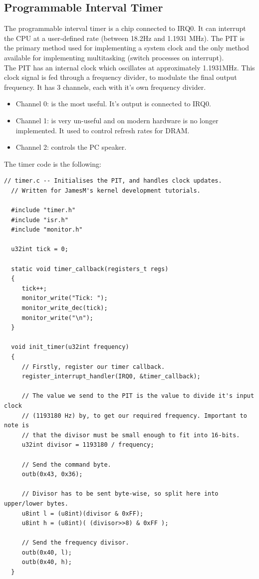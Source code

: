 \documentclass[12pt]{article}
\begin{document}
\subsection{Programmable Interval Timer}
The programmable interval timer is a chip connected to IRQ0. It can interrupt the CPU at a user-defined rate (between 18.2Hz and 1.1931 MHz). The PIT is the primary method used for implementing a system clock and the only method available for implementing multitasking (switch processes on interrupt).\\
The PIT has an internal clock which oscillates at approximately 1.1931MHz. This clock signal is fed through a frequency divider, to modulate the final output frequency. It has 3 channels, each with it's own frequency divider.
\begin{itemize}
  \item Channel 0: is the most useful. It's output is connected to IRQ0.
  \item Channel 1: is very un-useful and on modern hardware is no longer implemented. It used to control refresh rates for DRAM.
  \item Channel 2: controls the PC speaker.
\end{itemize}

The timer code is the following:
\begin{lstlisting}[style=CStyle]
  // timer.c -- Initialises the PIT, and handles clock updates.
  // Written for JamesM's kernel development tutorials.

  #include "timer.h"
  #include "isr.h"
  #include "monitor.h"

  u32int tick = 0;

  static void timer_callback(registers_t regs)
  {
     tick++;
     monitor_write("Tick: ");
     monitor_write_dec(tick);
     monitor_write("\n");
  }

  void init_timer(u32int frequency)
  {
     // Firstly, register our timer callback.
     register_interrupt_handler(IRQ0, &timer_callback);

     // The value we send to the PIT is the value to divide it's input clock
     // (1193180 Hz) by, to get our required frequency. Important to note is
     // that the divisor must be small enough to fit into 16-bits.
     u32int divisor = 1193180 / frequency;

     // Send the command byte.
     outb(0x43, 0x36);

     // Divisor has to be sent byte-wise, so split here into upper/lower bytes.
     u8int l = (u8int)(divisor & 0xFF);
     u8int h = (u8int)( (divisor>>8) & 0xFF );

     // Send the frequency divisor.
     outb(0x40, l);
     outb(0x40, h);
  }
\end{lstlisting}
\end{document}
